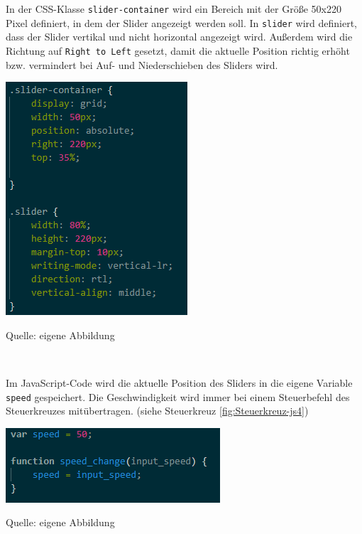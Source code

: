 \documentclass[ngerman,12pt,a4paper]{article}
\begin{document}
	In der CSS-Klasse \texttt{slider-container} wird ein Bereich mit der Größe 50x220 Pixel definiert, in dem der Slider angezeigt werden soll. In \texttt{slider} wird definiert, dass der Slider vertikal und nicht horizontal angezeigt wird. Außerdem wird die Richtung auf \texttt{Right to Left} gesetzt, damit die aktuelle Position richtig erhöht bzw. vermindert bei Auf- und Niederschieben des Sliders wird. \\
	\begin{center}
		\begin{minipage}[t]{0.45\textwidth}
			\includegraphics{Pictures/speed-css}
			\label{fig:speed-css}
			\vspace{-10pt}
			\begin{center}
				\par\small Quelle: eigene Abbildung 
			\end{center}
		\end{minipage} \\[1.5cm]
	\end{center}
	Im JavaScript-Code wird die aktuelle Position des Sliders in die eigene Variable \texttt{speed} gespeichert. Die Geschwindigkeit wird immer bei einem Steuerbefehl des Steuerkreuzes mitübertragen. (siehe Steuerkreuz  \ref{fig:Steuerkreuz-js4})
	\begin{center}
		\begin{minipage}[t]{0.55\textwidth}
			\includegraphics{Pictures/speed-js}
			\label{fig:speed-js}
			\vspace{-10pt}
			\begin{center}
				\par\small Quelle: eigene Abbildung 
			\end{center}
		\end{minipage} \\[0.75cm]
	\end{center}
				
\end{document}
